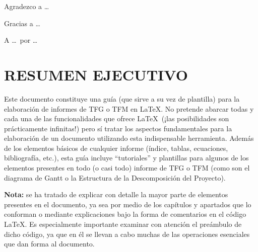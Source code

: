 \documentclass[a4paper, 11pt, spanish, twoside]{article}
\newcommand\blankpage{%
    \null
    \thispagestyle{empty}%
    \newpage}
\begin{document}
Agradezco a \dots

Gracias a \dots

A \dots \ por \dots

\afterpage{\blankpage} %




\newpage
\section*{RESUMEN EJECUTIVO} %

Este documento constituye una guía (que sirve a su vez de plantilla) para la elaboración de informes de TFG o TFM en \LaTeX. No pretende abarcar todas y cada una de las funcionalidades que ofrece \LaTeX \ (¡las posibilidades son prácticamente infinitas!) pero sí tratar los aspectos fundamentales para la elaboración de un documento utilizando esta indispensable herramienta. Además de los elementos básicos de cualquier informe (índice, tablas, ecuaciones, bibliografía, etc.), esta guía incluye ``tutoriales'' y plantillas para algunos de los elementos presentes en todo (o casi todo) informe de TFG o TFM (como son el diagrama de Gantt o la Estructura
de la Descomposición del Proyecto). 

\textbf{Nota:} se ha tratado de explicar con detalle la mayor parte de elementos presentes en el documento, ya sea por medio de los capítulos y apartados que lo conforman o mediante explicaciones bajo la forma de comentarios en el código \LaTeX. Es especialmente importante examinar con atención el preámbulo de dicho código, ya que en él se llevan a cabo muchas de las operaciones esenciales que dan forma al documento.
\end{document}
